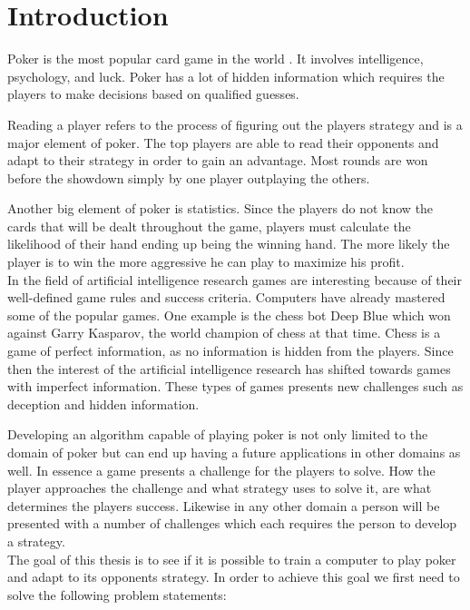 \section*{Introduction}
Poker is the most popular card game in the world \cite{poker-popular}. It involves intelligence, psychology, and luck. Poker has a lot of hidden information which requires the players to make decisions based on qualified guesses.  

Reading a player refers to the process of figuring out the players strategy and is a major element of poker. The top players are able to read their opponents and adapt to their strategy in order to gain an advantage. Most rounds are won before the showdown simply by one player outplaying the others. 

Another big element of poker is statistics. Since the players do not know the cards that will be dealt throughout the game, players must calculate the likelihood of their hand ending up being the winning hand. The more likely the player is to win the more aggressive he can play to maximize his profit.\\


In the field of artificial intelligence research games are interesting because of their well-defined game rules and success criteria.
Computers have already mastered some of the popular games. One example is the chess bot Deep Blue which won against Garry Kasparov, the world champion of chess at that time.
Chess is a game of perfect information, as no information is hidden from the players.
Since then the interest of the artificial intelligence research has shifted towards games with imperfect information. These types of games presents new challenges such as deception and hidden information. 

Developing an algorithm capable of playing poker is not only limited to the domain of poker but can end up having a future applications in other domains as well. In essence a game presents a challenge for the players to solve. How the player approaches the challenge and what strategy uses to solve it, are what determines the players success. Likewise in any other domain a person will be presented with a number of challenges which each requires the person to develop a strategy.\\


The goal of this thesis is to see if it is possible to train a computer to play poker and adapt to its opponents strategy. In order to achieve this goal we first need to solve the following problem statements:


